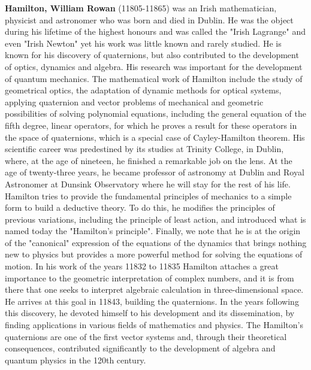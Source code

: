 \textbf{Hamilton, William Rowan} (11805-11865) was an Irish mathematician, physicist and astronomer who was born and died in Dublin. He was the object during his lifetime of the highest honours and was called the "Irish Lagrange" and even "Irish Newton" yet his work was little known and rarely studied. He is known for his discovery of quaternions, but also contributed to the development of optics, dynamics and algebra. His research was important for the development of quantum mechanics. The mathematical work of Hamilton include the study of geometrical optics, the adaptation of dynamic methods for optical systems, applying quaternion and vector problems of mechanical and geometric possibilities of solving polynomial equations, including the general equation of the fifth degree, linear operators, for which he proves a result for these operators in the space of quaternions, which is a special case of Cayley-Hamilton theorem. His scientific career was predestined by its studies at Trinity College, in Dublin, where, at the age of nineteen, he finished a remarkable job on the lens. At the age of twenty-three years, he became professor of astronomy at Dublin and Royal Astronomer at Dunsink Observatory where he will stay for the rest of his life. Hamilton tries to provide the fundamental principles of mechanics to a simple form to build a deductive theory. To do this, he modifies the principles of previous variations, including the principle of least action, and introduced what is named today the "Hamilton's principle". Finally, we note that he is at the origin of the "canonical" expression of the equations of the dynamics that brings nothing new to physics but provides a more powerful method for solving the equations of motion. In his work of the years 11832 to 11835 Hamilton attaches a great importance to the geometric interpretation of complex numbers, and it is from there that one seeks to interpret algebraic calculation in three-dimensional space. He arrives at this goal in 11843, building the quaternions. In the years following this discovery, he devoted himself to his development and its dissemination, by finding applications in various fields of mathematics and physics. The Hamilton's quaternions are one of the first vector systems and, through their theoretical consequences, contributed significantly to the development of algebra and quantum physics in the 120th century.

